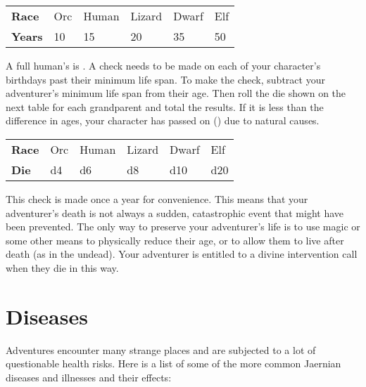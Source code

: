 \begin{multicols}{2}
\begin{normboxc}
\small
\begin{tabular}{@{}l| l l l l l}
\textbf{Race} & Orc & Human & Lizard & Dwarf & Elf\\
\textbf{Years} & 10 & 15 & 20 & 35 & 50\\
\end{tabular}
\end{normboxc}

 A full human's  is . A check needs to be made on each of your character's birthdays past their minimum life span. To make the check, subtract your adventurer's minimum life span from their age. Then roll the die shown on the next table for each grandparent and total the results. If it is less than the difference in ages, your character has passed on () due to natural causes.\\
\begin{normboxc}
\small
\begin{tabular}{@{}l| l l l l l}
\textbf{Race} & Orc & Human & Lizard & Dwarf & Elf\\
\textbf{Die} & d4 & d6 & d8 & d10 & d20\\
\end{tabular}
\end{normboxc}


This check is made once a year for convenience. This means that your adventurer's death is not always a sudden, catastrophic event that might have been prevented. The only way to preserve your adventurer's life is to use magic or some other means to physically reduce their age, or to allow them to live after death (as in the undead). Your adventurer is entitled to a divine intervention call when they die in this way.
\section{Diseases}
Adventures encounter many strange places and are subjected to a lot of questionable health risks. Here is a list of some of the more common Jaernian diseases and illnesses and their effects:


\end{multicols}
